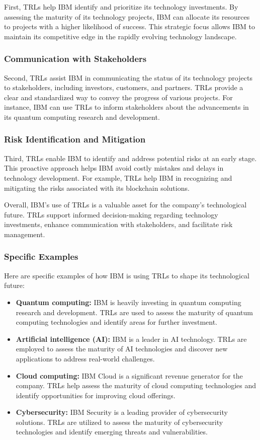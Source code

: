 First, TRLs help IBM identify and prioritize its technology investments. By assessing the maturity of its technology projects, IBM can allocate its resources to projects with a higher likelihood of success. This strategic focus allows IBM to maintain its competitive edge in the rapidly evolving technology landscape.

\subsubsection{Communication with Stakeholders}

Second, TRLs assist IBM in communicating the status of its technology projects to stakeholders, including investors, customers, and partners. TRLs provide a clear and standardized way to convey the progress of various projects. For instance, IBM can use TRLs to inform stakeholders about the advancements in its quantum computing research and development.

\subsubsection{Risk Identification and Mitigation}

Third, TRLs enable IBM to identify and address potential risks at an early stage. This proactive approach helps IBM avoid costly mistakes and delays in technology development. For example, TRLs help IBM in recognizing and mitigating the risks associated with its blockchain solutions.

Overall, IBM's use of TRLs is a valuable asset for the company's technological future. TRLs support informed decision-making regarding technology investments, enhance communication with stakeholders, and facilitate risk management.

\subsubsection{Specific Examples}

Here are specific examples of how IBM is using TRLs to shape its technological future:

\begin{itemize}
    \item \textbf{Quantum computing:} IBM is heavily investing in quantum computing research and development. TRLs are used to assess the maturity of quantum computing technologies and identify areas for further investment.
    \item \textbf{Artificial intelligence (AI):} IBM is a leader in AI technology. TRLs are employed to assess the maturity of AI technologies and discover new applications to address real-world challenges.
    \item \textbf{Cloud computing:} IBM Cloud is a significant revenue generator for the company. TRLs help assess the maturity of cloud computing technologies and identify opportunities for improving cloud offerings.
    \item \textbf{Cybersecurity:} IBM Security is a leading provider of cybersecurity solutions. TRLs are utilized to assess the maturity of cybersecurity technologies and identify emerging threats and vulnerabilities.
\end{itemize}

